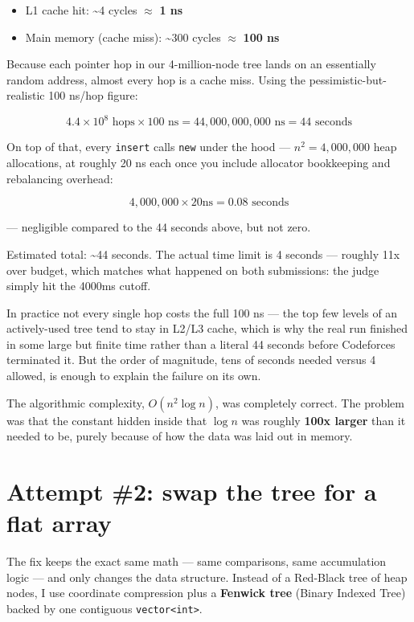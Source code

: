 \documentclass[11pt,a4paper]{article}
\begin{document}
\begin{itemize}
\item L1 cache hit: \textasciitilde{}4 cycles $\approx$ \textbf{1 ns}
\item Main memory (cache miss): \textasciitilde{}300 cycles $\approx$ \textbf{100 ns}
\end{itemize}

Because each pointer hop in our 4-million-node tree lands on an essentially random address, almost every hop is a cache miss. Using the pessimistic-but-realistic 100 ns/hop figure:


\[
4.4 \times 10^8 \text{ hops} \times 100\text{ ns} = 44{,}000{,}000{,}000 \text{ ns} = 44 \text{ seconds}
\]


On top of that, every \texttt{insert} calls \texttt{new} under the hood --- $n^2 = 4{,}000{,}000$ heap allocations, at roughly 20 ns each once you include allocator bookkeeping and rebalancing overhead:


\[
4{,}000{,}000 \times 20\text{ns} = 0.08 \text{ seconds}
\]


--- negligible compared to the 44 seconds above, but not zero.

Estimated total: \textasciitilde{}44 seconds. The actual time limit is 4 seconds --- roughly 11x over budget, which matches what happened on both submissions: the judge simply hit the 4000ms cutoff.

In practice not every single hop costs the full 100 ns --- the top few levels of an actively-used tree tend to stay in L2/L3 cache, which is why the real run finished in some large but finite time rather than a literal 44 seconds before Codeforces terminated it. But the order of magnitude, tens of seconds needed versus 4 allowed, is enough to explain the failure on its own.

The algorithmic complexity, $O(n^2 \log n)$, was completely correct. The problem was that the constant hidden inside that $\log n$ was roughly \textbf{100x larger} than it needed to be, purely because of how the data was laid out in memory.

\section{Attempt \#2: swap the tree for a flat array}

The fix keeps the exact same math --- same comparisons, same accumulation logic --- and only changes the data structure. Instead of a Red-Black tree of heap nodes, I use coordinate compression plus a \textbf{Fenwick tree} (Binary Indexed Tree) backed by one contiguous \texttt{vector\textless{}int\textgreater{}}.
\end{document}
